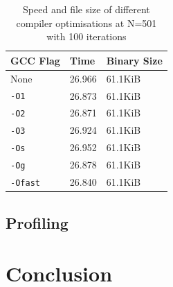 \documentclass[12pt]{article}
\begin{document}
\begin{table}[H]
    \centering
    \caption{Speed and file size of different compiler optimisations at N=501 with 100 iterations}
    \label{table:opt}
    \begin{tabular}{ | m{4cm} | m{3cm} | m{3cm} | }
        \hline
        \textbf{GCC Flag} & \textbf{Time} & \textbf{Binary Size}\\
        \hline
        None & 26.966 & 61.1KiB\\
        \hline
        \texttt{-O1} & 26.873 & 61.1KiB\\
        \hline
        \texttt{-O2} & 26.871 & 61.1KiB\\
        \hline
        \texttt{-O3} & 26.924 & 61.1KiB\\
        \hline
        \texttt{-Os} & 26.952 & 61.1KiB\\
        \hline
        \texttt{-Og} & 26.878 & 61.1KiB\\
        \hline
        \texttt{-Ofast} & 26.840 & 61.1KiB\\
        \hline
    \end{tabular}
\end{table}

\subsection{Profiling}

\section{Conclusion}

\newpage
\medskip


\end{document}
